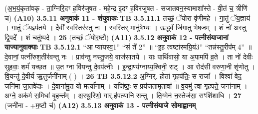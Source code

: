 \documentclass[17pt]{extarticle}
\begin{document}
{{{{{{{{{{{{{{{{{{{                  \newline
                                    (अ॒भ॒यं॒कृता॑वकृ - ता॒ग्निरि॒दꣳ ह॒विर॑जुषत - महे॒न्द्र इ॒दꣳ ह॒विर॑जुषत - सजातवन॒स्यामाशा᳚स्ते - वी॒तं च॒ त्रीणि॑ च) \textbf{(A10)} \newline \newline
                \textbf{ 3.5.11    अनुवाकं   11 - शंयुवाकः} \newline
                                \textbf{ TB 3.5.11.1} \newline
                  तच्छं॒ ॅयोरा वृ॑णीमहे । गा॒तुं ॅय॒ज्ञाय॑ । गा॒तुं ॅय॒ज्ञ्प॑तये । दैवी᳚ स्व॒स्तिर॑स्तु नः । स्व॒स्तिर् मानु॑षेभ्यः । ऊ॒र्द्ध्वं जि॑गातु भेष॒जम् । शं नो॑ अस्तु द्वि॒पदे᳚ । शं चतु॑ष्पदे । \textbf{ 25} \newline
                  \newline
                                    (तच्छं॒ ॅयोर॒ष्टौ) \textbf{(A11)} \newline \newline
                \textbf{ 3.5.12    अनुवाकं   12 - पत्नीसंयाजानां याज्यानुवाक्याः} \newline
                                \textbf{ TB 3.5.12.1} \newline
                  “आ प्या॑यस्व॒{1}” “सं ते᳚ {2}” ॥ “इ॒ह त्वष्टा॑रमग्रि॒यं{3}” “तन्न॑स्तु॒रीप᳚म् {4}” ॥ दे॒वानां॒ पत्नी॑रुश॒तीर॑वन्तु नः । प्राव॑न्तु नस्तु॒जये॒ वाज॑सातये । याः पार्थि॑वासो॒ या अ॒पामपि॑ व्र॒ते । ता नो॑ देवीः सुहवाः॒ शर्म॑ यच्छत ॥ उ॒त ग्ना वि॑यन्तु दे॒वप॑त्नीः । इ॒न्द्रा॒ण्य॑ग्नाय्य॒श्विनी॒ राट् । आ रोद॑सी वरुणा॒नी शृ॑णोतु । वि॒यन्तु॑ दे॒वीर्य ऋ॒तुर्जनी॑नाम् ( ) । \textbf{ 26} \newline
                  \newline
                                \textbf{ TB 3.5.12.2} \newline
                  अ॒ग्निर्. होता॑ गृ॒हप॑तिः॒ स राजा᳚ । विश्वा॑ वेद॒ जनि॑मा जा॒तवे॑दाः । दे॒वाना॑मु॒त यो मर्त्या॑नाम् । यजि॑ष्ठः॒ स प्रय॑जतामृ॒तावा᳚ ॥ व॒यमु॑ त्वा गृहपते॒ जना॑नाम् । अग्ने॒ अक॑र्म स॒मिधा॑ बृ॒हन्त᳚म् । अ॒स्थू॒रिणो॒ गार्.ह॑पत्यानि सन्तु । ति॒ग्मेन॑ न॒स्तेज॑सा॒ सꣳशि॑शाधि । \textbf{ 27} \newline
                  \newline
                                    (जनी॑ना - +म॒ष्टौ च॑) \textbf{(A12)} \newline \newline
                \textbf{ 3.5.13    अनुवाकं   13 - पत्नीसंयाजे सोमाह्वानम्} \newline
}}}}}}}}}}}}}}}}}}}
\end{document}
